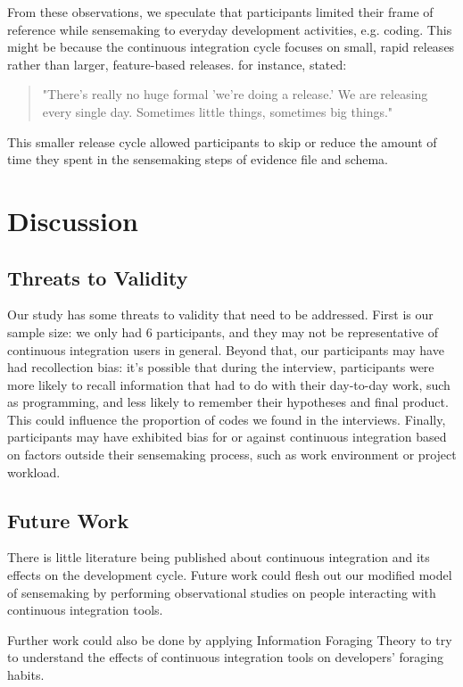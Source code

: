 \documentclass{sig-alternate}
\begin{document}
From these observations, we speculate that participants limited their frame of reference while sensemaking to everyday development activities, e.g. coding. This might be because the continuous integration cycle focuses on small, rapid releases rather than larger, feature-based releases. for instance, \cpg stated:

\begin{quote}
"There's really no huge formal 'we're doing a release.' We are releasing every single day. Sometimes little things, sometimes big things."	
\end{quote}


This smaller release cycle allowed participants to skip or reduce the amount of time they spent in the sensemaking steps of evidence file and schema. 

\section{Discussion}
\subsection{Threats to Validity}
Our study has some threats to validity that need to be addressed. First is our sample size: we only had 6 participants, and they may not be representative of continuous integration users in general. Beyond that, our participants may have had recollection bias: it's possible that during the interview, participants were more likely to recall information that had to do with their day-to-day work, such as programming, and less likely to remember their hypotheses and final product. This could influence the proportion of codes we found in the interviews. Finally, participants may have exhibited bias for or against continuous integration based on factors outside their sensemaking process, such as work environment or project workload.
\subsection{Future Work}
There is little literature being published about continuous integration and its effects on the development cycle. Future work could flesh out our modified model of sensemaking by performing observational studies on people interacting with continuous integration tools. 

Further work could also be done by applying Information Foraging Theory to try to understand the effects of continuous integration tools on developers' foraging habits. 
\end{document}
